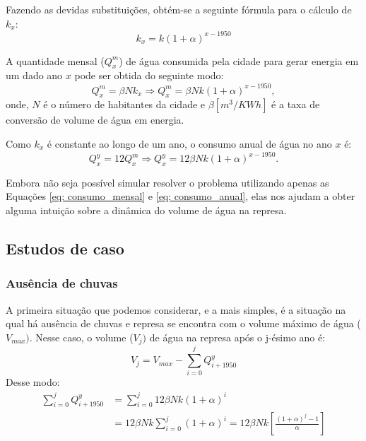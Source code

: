 \documentclass{article}
\begin{document}
Fazendo as devidas substituições, obtém-se a seguinte fórmula para o cálculo de $k_x$:
\begin{equation}
    k_x = k(1 + \alpha)^{x - 1950}
\end{equation}

A quantidade mensal ($Q_x^m$) de água consumida pela cidade para gerar energia em um dado ano $x$ pode ser obtida do seguinte modo:
\begin{equation}
\label{eq: consumo_mensal}
    Q_x^m = \beta N k_x \Rightarrow  Q_x^m = \beta N k(1 + \alpha)^{x - 1950},
\end{equation}
onde, $N$ é o número de habitantes da cidade e $\beta [m^3/KWh]$ é a taxa de conversão de volume de água em energia.

Como $k_x$ é constante ao longo de um ano, o consumo anual de água no ano $x$ é:
\begin{equation}
\label{eq: consumo_anual}
    Q_x^y = 12 Q_x^m \Rightarrow Q_x^y = 12\beta N k(1 + \alpha)^{x - 1950}.
\end{equation}

Embora não seja possível simular resolver o problema utilizando apenas as Equações \ref{eq: consumo_mensal} e \ref{eq: consumo_anual}, elas nos ajudam a obter alguma intuição sobre a dinâmica do volume de água na represa.

\subsection{Estudos de caso}

\subsubsection{Ausência de chuvas}

A primeira situação que podemos considerar, e a mais simples, é a situação na qual há ausência de chuvas e represa se encontra com o volume máximo de água ($V_{max})$. Nesse caso, o volume ($V_j)$ de água na represa após o j-ésimo ano é:
\begin{equation}
    V_j = V_{max} - \sum_{i=0}^{j} Q_{i + 1950}^y
\end{equation}
Desse modo:
\begin{align*}
    \sum_{i=0}^{j} Q_{i + 1950}^y &= \sum_{i=0}^{j} 12\beta N k(1 + \alpha)^{i} \\
                                  &= 12\beta N k\sum_{i=0}^{j} (1 + \alpha)^{i} = 12\beta Nk \left[ \frac{(1 + \alpha)^{j} - 1}{\alpha}\right]
\end{align*}
\end{document}
